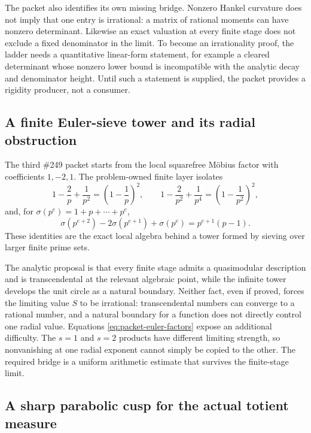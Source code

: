 \documentclass[11pt]{article}
\theoremstyle{definition}
\theoremstyle{remark}
\begin{document}
The packet also identifies its own missing bridge.  Nonzero Hankel curvature
does not imply that one entry is irrational: a matrix of rational moments can
have nonzero determinant.  Likewise an exact valuation at every finite stage
does not exclude a fixed denominator in the limit.  To become an irrationality
proof, the ladder needs a quantitative linear-form statement, for example a
cleared determinant whose nonzero lower bound is incompatible with the
analytic decay and denominator height.  Until such a statement is supplied,
the packet provides a rigidity producer, not a consumer.

\subsection{A finite Euler-sieve tower and its radial obstruction}
\label{sec:packet-sieve}

The third \#249 packet starts from the local squarefree M\"obius factor with
coefficients $1,-2,1$.  The problem-owned finite layer isolates
\[
 1-\frac2p+\frac1{p^2}=\left(1-\frac1p\right)^2,
 \qquad
 1-\frac2{p^2}+\frac1{p^4}=\left(1-\frac1{p^2}\right)^2,
 \tag{S1}\label{eq:packet-euler-factors}
\]
and, for $\sigma(p^e)=1+p+\cdots+p^e$,
\[
 \sigma(p^{e+2})-2\sigma(p^{e+1})+\sigma(p^e)
   =p^{e+1}(p-1).
 \tag{S2}\label{eq:packet-second-difference}
\]
These identities are the exact local algebra behind a tower formed by sieving
over larger finite prime sets.

The analytic proposal is that every finite stage admits a quasimodular
description and is transcendental at the relevant algebraic point, while the
infinite tower develops the unit circle as a natural boundary.  Neither fact,
even if proved, forces the limiting value $S$ to be irrational: transcendental
numbers can converge to a rational number, and a natural boundary for a
function does not directly control one radial value.  Equations
\eqref{eq:packet-euler-factors} expose an additional difficulty.  The $s=1$
and $s=2$ products have different limiting strength, so nonvanishing at one
radial exponent cannot simply be copied to the other.  The required bridge is
a uniform arithmetic estimate that survives the finite-stage limit.

\subsection{A sharp parabolic cusp for the actual totient measure}
\label{sec:packet-cusp}
\end{document}

